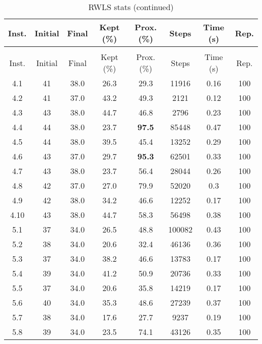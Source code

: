 \begin{longtable}{@{\extracolsep{5pt}}cccccccc}
	\caption{RWLS stats}\\
	\toprule
	Inst. & Initial & Final & Kept (\%) & Prox. (\%) & Steps & Time (s) & Rep.\\
	\midrule
	\endfirsthead
	\caption[]{RWLS stats (continued)}\\
	\toprule
	Inst. & Initial & Final & Kept (\%) & Prox. (\%) & Steps & Time (s) & Rep.\\
	\midrule
	\endhead
	\bottomrule
	\endfoot
	4.1 &
		41 & 38.0 &
			26.3
		&
			29.3
		& 11916 & 0.16 & 100
	\\
	4.2 &
		41 & 37.0 &
			43.2
		&
			49.3
		& 2121 & 0.12 & 100
	\\
	4.3 &
		43 & 38.0 &
			44.7
		&
			46.8
		& 2796 & 0.23 & 100
	\\
	4.4 &
		44 & 38.0 &
			23.7
		&
			\textbf{97.5}
		& 85448 & 0.47 & 100
	\\
	4.5 &
		44 & 38.0 &
			39.5
		&
			45.4
		& 13252 & 0.29 & 100
	\\
	4.6 &
		43 & 37.0 &
			29.7
		&
			\textbf{95.3}
		& 62501 & 0.33 & 100
	\\
	4.7 &
		43 & 38.0 &
			23.7
		&
			56.4
		& 28044 & 0.26 & 100
	\\
	4.8 &
		42 & 37.0 &
			27.0
		&
			79.9
		& 52020 & 0.3 & 100
	\\
	4.9 &
		42 & 38.0 &
			34.2
		&
			46.6
		& 12252 & 0.17 & 100
	\\
	4.10 &
		43 & 38.0 &
			44.7
		&
			58.3
		& 56498 & 0.38 & 100
	\\
	5.1 &
		37 & 34.0 &
			26.5
		&
			48.8
		& 100082 & 0.43 & 100
	\\
	5.2 &
		38 & 34.0 &
			20.6
		&
			32.4
		& 46136 & 0.36 & 100
	\\
	5.3 &
		37 & 34.0 &
			38.2
		&
			46.6
		& 13783 & 0.17 & 100
	\\
	5.4 &
		39 & 34.0 &
			41.2
		&
			50.9
		& 20736 & 0.33 & 100
	\\
	5.5 &
		37 & 34.0 &
			20.6
		&
			35.8
		& 14219 & 0.17 & 100
	\\
	5.6 &
		40 & 34.0 &
			35.3
		&
			48.6
		& 27239 & 0.37 & 100
	\\
	5.7 &
		38 & 34.0 &
			17.6
		&
			27.7
		& 9237 & 0.19 & 100
	\\
	5.8 &
		39 & 34.0 &
			23.5
		&
			74.1
		& 43126 & 0.35 & 100
	\\

\end{longtable}
